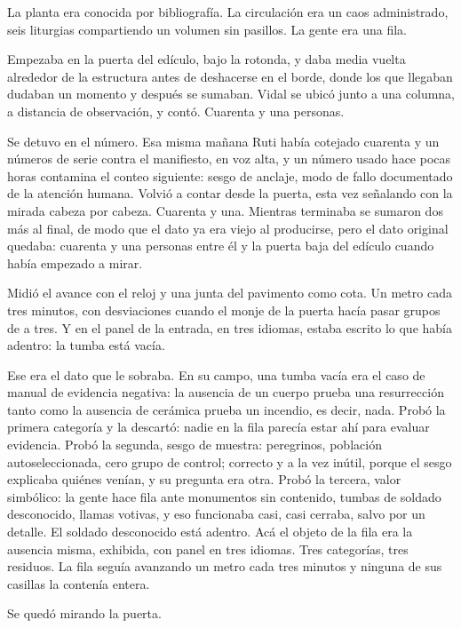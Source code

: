 La planta era conocida por bibliografía. La circulación era un caos administrado, seis liturgias compartiendo un volumen sin pasillos. La gente era una fila.

Empezaba en la puerta del edículo, bajo la rotonda, y daba media vuelta alrededor de la estructura antes de deshacerse en el borde, donde los que llegaban dudaban un momento y después se sumaban. Vidal se ubicó junto a una columna, a distancia de observación, y contó. Cuarenta y una personas.

Se detuvo en el número. Esa misma mañana Ruti había cotejado cuarenta y un números de serie contra el manifiesto, en voz alta, y un número usado hace pocas horas contamina el conteo siguiente: sesgo de anclaje, modo de fallo documentado de la atención humana. Volvió a contar desde la puerta, esta vez señalando con la mirada cabeza por cabeza. Cuarenta y una. Mientras terminaba se sumaron dos más al final, de modo que el dato ya era viejo al producirse, pero el dato original quedaba: cuarenta y una personas entre él y la puerta baja del edículo cuando había empezado a mirar.

Midió el avance con el reloj y una junta del pavimento como cota. Un metro cada tres minutos, con desviaciones cuando el monje de la puerta hacía pasar grupos de a tres. Y en el panel de la entrada, en tres idiomas, estaba escrito lo que había adentro: la tumba está vacía.

Ese era el dato que le sobraba. En su campo, una tumba vacía era el caso de manual de evidencia negativa: la ausencia de un cuerpo prueba una resurrección tanto como la ausencia de cerámica prueba un incendio, es decir, nada. Probó la primera categoría y la descartó: nadie en la fila parecía estar ahí para evaluar evidencia. Probó la segunda, sesgo de muestra: peregrinos, población autoseleccionada, cero grupo de control; correcto y a la vez inútil, porque el sesgo explicaba quiénes venían, y su pregunta era otra. Probó la tercera, valor simbólico: la gente hace fila ante monumentos sin contenido, tumbas de soldado desconocido, llamas votivas, y eso funcionaba casi, casi cerraba, salvo por un detalle. El soldado desconocido está adentro. Acá el objeto de la fila era la ausencia misma, exhibida, con panel en tres idiomas. Tres categorías, tres residuos. La fila seguía avanzando un metro cada tres minutos y ninguna de sus casillas la contenía entera.

Se quedó mirando la puerta.

